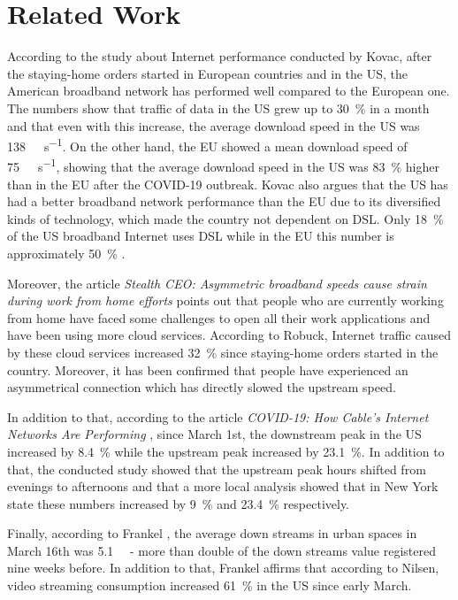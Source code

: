 \documentclass[conference]{IEEEtran}
\begin{document}
\section{Related Work}
\label{sec:related-work}

According to the study about Internet performance conducted by Kovac, after the staying-home orders started in European countries and in the US, the American broadband network has performed well compared to the European one. The numbers show that traffic of data in the US grew up to \SI{30}{\percent} in a month and that even with this increase, the average download speed in the US was \SI{138}{\mega\bit\per\second}. On the other hand, the EU showed a mean download speed of \SI{75}{\mega\bit\per\second}, showing that the average download speed in the US was \SI{83}{\percent} higher than in the EU after the COVID-19 outbreak. Kovac also argues that the US has had a better broadband network performance than the EU due to its diversified kinds of technology, which made the country not dependent on DSL. Only \SI{18}{\percent} of the US broadband Internet uses DSL while in the EU this number is approximately \SI{50}{\percent} \cite{kovacs}. 

Moreover, the article \textit{Stealth CEO: Asymmetric broadband speeds cause strain during work from home efforts} \cite{robuck} points out that people who are currently working from home have faced some challenges to open all their work applications and have been using more cloud services. According to Robuck, Internet traffic caused by these cloud services increased \SI{32}{\percent} since staying-home orders started in the country. Moreover, it has been confirmed that people have experienced an asymmetrical connection which has directly slowed the upstream speed. 

In addition to that, according to the article \textit{COVID-19: How Cable's Internet Networks Are Performing} \cite{ncta}, since March 1st, the downstream peak in the US increased by \SI{8.4}{\percent} while the upstream peak increased by \SI{23.1}{\percent}. In addition to that, the conducted study showed that the upstream peak hours shifted from evenings to afternoons and that a more local analysis showed that in New York state these numbers increased by \SI{9}{\percent} and \SI{23.4}{\percent} respectively. 

Finally, according to Frankel \cite{frankel}, the average down streams in urban spaces in March 16th was \SI{5.1}{\giga\byte} - more than double of the down streams value registered nine weeks before. In addition to that, Frankel affirms that according to Nilsen, video streaming consumption increased \SI{61}{\percent} in the US since early March. 
\end{document}
